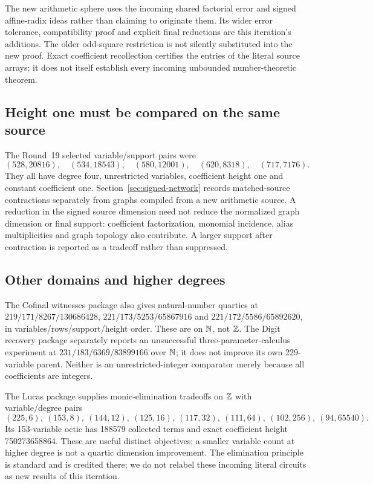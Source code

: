 The new arithmetic sphere uses the incoming shared factorial error and
signed affine-radix ideas rather than claiming to originate them. Its
wider error tolerance, compatibility proof and explicit final reductions
are this iteration's additions. The older odd-square restriction is not
silently substituted into the new proof. Exact coefficient recollection
certifies the entries of the literal source arrays; it does not itself
establish every incoming unbounded number-theoretic theorem.

\subsection{Height one must be compared on the same source}
The Round~19 selected variable/support pairs were
\[
 (528,20816),\quad(534,18543),\quad(580,12001),\quad
 (620,8318),\quad(717,7176).
\]
They all have degree four, unrestricted variables, coefficient height one
and constant coefficient one. Section~\ref{sec:signed-network} records
matched-source contractions separately from graphs compiled from a new
arithmetic source. A reduction in the signed source dimension need not
reduce the normalized graph dimension or final support: coefficient
factorization, monomial incidence, alias multiplicities and graph topology
also contribute. A larger support after contraction is reported as a
tradeoff rather than suppressed.

\subsection{Other domains and higher degrees}
The Cofinal witnesses package also gives natural-number quartics at
$219/171/8267/130686428$, $221/173/5253/65867916$ and
$221/172/5586/65892620$, in variables/rows/support/height order.
These are on $\mathbb N$, not $\mathbb Z$. The Digit recovery package separately reports
an unsuccessful three-parameter-calculus experiment at
$231/183/6369/83899166$ over $\mathbb N$; it does not improve its own
229-variable parent. Neither is an unrestricted-integer comparator merely
because all coefficients are integers.

The Lucas package supplies monic-elimination tradeoffs on $\mathbb Z$ with
variable/degree pairs
\[
 (225,6),\ (153,8),\ (144,12),\ (125,16),\ (117,32),\
 (111,64),\ (102,256),\ (94,65540).
\]
Its 153-variable octic has 188579 collected terms and exact coefficient
height 750273658864. These are useful distinct objectives; a smaller
variable count at higher degree is not a quartic dimension improvement.
The elimination principle is standard and is credited there; we do not
relabel these incoming literal circuits as new results of this iteration.


